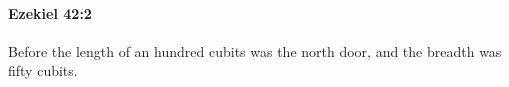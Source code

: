
		\paragraph{Ezekiel 42:2} %
			\label{EZEKIEL-42-2}

			Before the length of an hundred cubits was the north door, and the breadth was fifty cubits.


